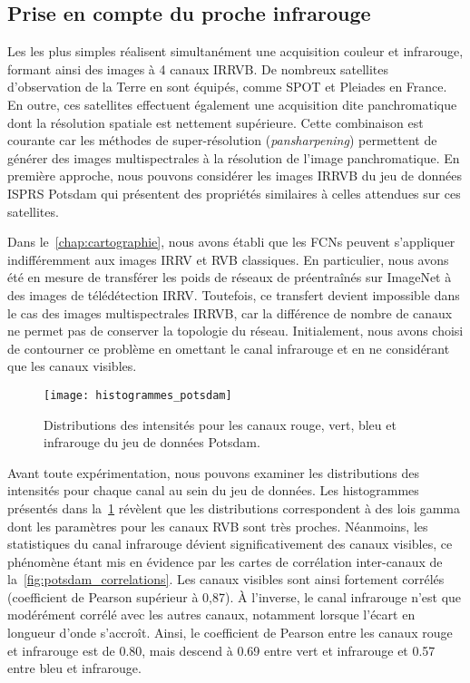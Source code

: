 \subsection{Prise en compte du proche infrarouge}

Les  les plus simples réalisent simultanément une acquisition couleur et infrarouge, formant ainsi des images à 4 canaux \gls{IRRVB}.
De nombreux satellites d'observation de la Terre en sont équipés, comme \gls{SPOT} et \gls{Pleiades} en France. En outre, ces satellites effectuent également une acquisition dite panchromatique dont la résolution spatiale est nettement supérieure. Cette combinaison est courante car les méthodes de super-résolution (\emph{pansharpening}) permettent de générer des images multispectrales à la résolution de l'image panchromatique. En première approche, nous pouvons considérer les images \gls{IRRVB} du jeu de données \gls{ISPRS} Potsdam qui présentent des propriétés similaires à celles attendues sur ces satellites.

Dans le~\cref{chap:cartographie}, nous avons établi que les \glspl{FCN} peuvent s'appliquer indifféremment aux images \gls{IRRV} et \gls{RVB} classiques. En particulier, nous avons été en mesure de transférer les poids de réseaux de préentraînés sur ImageNet à des images de télédétection \gls{IRRV}. Toutefois, ce transfert devient impossible dans le cas des images multispectrales \gls{IRRVB}, car la différence de nombre de canaux ne permet pas de conserver la topologie du réseau. Initialement, nous avons choisi de contourner ce problème en omettant le canal infrarouge et en ne considérant que les canaux visibles.

\begin{figure}[h]
  \texttt{[image: histogrammes\_potsdam]}
  \caption{Distributions des intensités pour les canaux rouge, vert, bleu et infrarouge du jeu de données  Potsdam.}
  \label{fig:potsdam_histograms}
\end{figure}

Avant toute expérimentation, nous pouvons examiner les distributions des intensités pour chaque canal au sein du jeu de données. Les histogrammes présentés dans la~\cref{fig:potsdam_histograms} révèlent que les distributions correspondent à des lois gamma dont les paramètres pour les canaux \gls{RVB} sont très proches. Néanmoins, les statistiques du canal infrarouge dévient significativement des canaux visibles, ce phénomène étant mis en évidence par les cartes de corrélation inter-canaux de la~\cref{fig:potsdam_correlations}. Les canaux visibles sont ainsi fortement corrélés (coefficient de Pearson supérieur à 0,87). À l'inverse, le canal infrarouge n'est que modérément corrélé avec les autres canaux, notamment lorsque l'écart en longueur d'onde s'accroît. Ainsi, le coefficient de Pearson entre les canaux rouge et infrarouge est de \num{0,80}, mais descend à \num{0,69} entre vert et infrarouge et \num{0,57} entre bleu et infrarouge.

